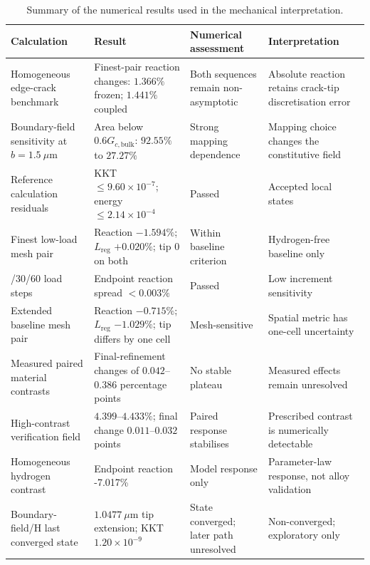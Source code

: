 \documentclass[review,12pt]{elsarticle}
\begin{document}
\begin{table}[!htbp]
\centering
\caption{Summary of the numerical results used in the mechanical interpretation.}
\label{tab:S6}
\scriptsize
\setlength{\tabcolsep}{4pt}
\begin{tabularx}{\textwidth}{>{\raggedright\arraybackslash}p{}XXX}
\toprule
\textbf{Calculation} & \textbf{Result} & \textbf{Numerical assessment} & \textbf{Interpretation} \\
\midrule
Homogeneous edge-crack benchmark & Finest-pair reaction changes: \(1.366\%\) frozen; \(1.441\%\) coupled & Both sequences remain non-asymptotic & Absolute reaction retains crack-tip discretisation error \\
Boundary-field sensitivity at \(b=1.5~\mu\mathrm{m}\) & Area below \(0.6G_{c,\mathrm{bulk}}\): \(92.55\%\) to \(27.27\%\) & Strong mapping dependence & Mapping choice changes the constitutive field \\
Reference calculation residuals & KKT \(\le9.60\times10^{-7}\); energy \(\le2.14\times10^{-4}\) & Passed & Accepted local states \\
Finest low-load mesh pair & Reaction \(-1.594\%\); \(L_{\mathrm{reg}}\) \(+0.020\%\); tip 0 on both & Within baseline criterion & Hydrogen-free baseline only \\
15/30/60 load steps & Endpoint reaction spread \(<0.003\%\) & Passed & Low increment sensitivity \\
Extended baseline mesh pair & Reaction \(-0.715\%\); \(L_{\mathrm{reg}}\) \(-1.029\%\); tip differs by one cell & Mesh-sensitive & Spatial metric has one-cell uncertainty \\
Measured paired material contrasts & Final-refinement changes of \(0.042\)--\(0.386\) percentage points & No stable plateau & Measured effects remain unresolved \\
High-contrast verification field & \(4.399\)--\(4.433\%\); final change \(0.011\)--\(0.032\) points & Paired response stabilises & Prescribed contrast is numerically detectable \\
Homogeneous hydrogen contrast & Endpoint reaction -7.017\% & Model response only & Parameter-law response, not alloy validation \\
Boundary-field/H last converged state & \(1.0477~\mu\mathrm{m}\) tip extension; KKT \(1.20\times10^{-9}\) & State converged; later path unresolved & Non-converged; exploratory only \\
\bottomrule
\end{tabularx}
\end{table}
\end{document}
